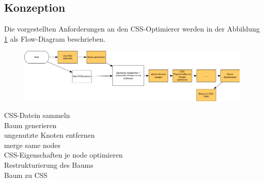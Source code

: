 
\subsection{Konzeption}

Die vorgestellten Anforderungen an den CSS-Optimierer werden in der Abbildung \ref{app-workflow} als Flow-Diagram beschrieben. 
 
\begin{figure}[h!]
\includegraphics[width=1.0\textwidth]{img/app-workflow.png}
\label{app-workflow}
\end{figure}

\begin{description}
    \item[CSS-Datein sammeln]

    \item[Baum generieren]
    
    \item[ungenutzte Knoten entfernen]
    
    \item[merge same nodes]
    
    \item[CSS-Eigenschaften je node optimieren]
    
    \item[Restrukturierung des Baums]
    
    \item[Baum zu CSS]    
\end{description}

